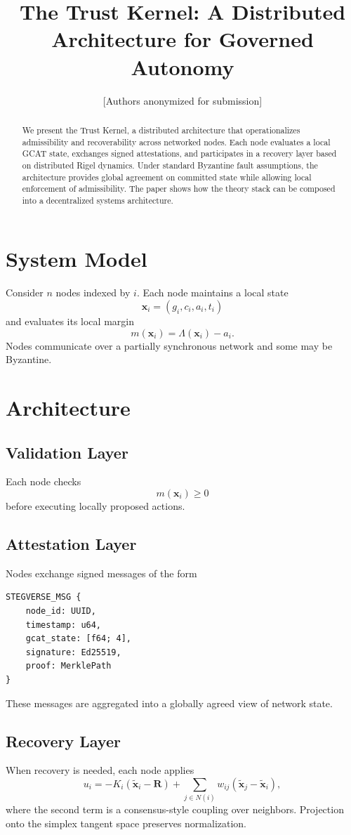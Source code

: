 \documentclass[letterpaper,10pt,conference]{ieeeconf}
\title{\bf The Trust Kernel: A Distributed Architecture for Governed Autonomy}
\author{[Authors anonymized for submission]}
\newcommand{\x}{\mathbf{x}}
\newcommand{\xt}{\tilde{\mathbf{x}}}
\newcommand{\Lam}{\Lambda}
\newcommand{\Rigel}{\mathbf{R}}
\begin{document}
\maketitle
\thispagestyle{empty}
\pagestyle{empty}
\begin{abstract}
We present the Trust Kernel, a distributed architecture that operationalizes admissibility and recoverability across networked nodes. Each node evaluates a local GCAT state, exchanges signed attestations, and participates in a recovery layer based on distributed Rigel dynamics. Under standard Byzantine fault assumptions, the architecture provides global agreement on committed state while allowing local enforcement of admissibility. The paper shows how the theory stack can be composed into a decentralized systems architecture.
\end{abstract}
\section{System Model}
Consider $n$ nodes indexed by $i$. Each node maintains a local state
\[
\x_i=(g_i,c_i,a_i,t_i)
\]
and evaluates its local margin
\[
m(\x_i)=\Lam(\x_i)-a_i.
\]
Nodes communicate over a partially synchronous network and some may be Byzantine.
\section{Architecture}
\subsection{Validation Layer}
Each node checks
\[
m(\x_i)\ge 0
\]
before executing locally proposed actions.
\subsection{Attestation Layer}
Nodes exchange signed messages of the form
\begin{verbatim}
STEGVERSE_MSG {
    node_id: UUID,
    timestamp: u64,
    gcat_state: [f64; 4],
    signature: Ed25519,
    proof: MerklePath
}
\end{verbatim}
These messages are aggregated into a globally agreed view of network state.
\subsection{Recovery Layer}
When recovery is needed, each node applies
\[
u_i=-K_i(\xt_i-\Rigel)+\sum_{j\in N(i)} w_{ij}(\xt_j-\xt_i),
\]
where the second term is a consensus-style coupling over neighbors. Projection onto the simplex tangent space preserves normalization.
\end{document}
